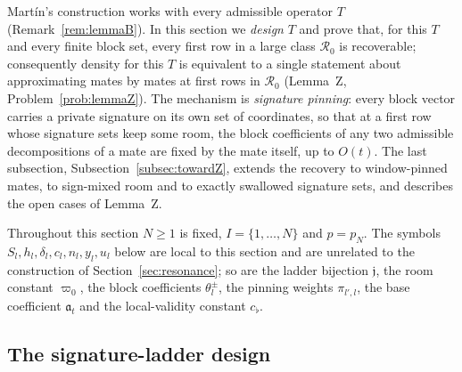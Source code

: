 \documentclass[10pt]{amsart}
\theoremstyle{definition}
\theoremstyle{remark}
\begin{document}
Mart\'in's construction works with every admissible operator $T$
(Remark~\ref{rem:lemmaB}).  In this section we \emph{design} $T$ and prove
that, for this $T$ and every finite block set, every first row in a large
class $\mathcal R_0$ is recoverable; consequently density for this $T$ is
equivalent to a single statement about approximating mates by mates at
first rows in $\mathcal R_0$ (Lemma~Z, Problem~\ref{prob:lemmaZ}).  The
mechanism is \emph{signature pinning}: every block vector carries a private
signature on its own set of coordinates, so that at a first row whose
signature sets keep some room, the block coefficients of any two admissible
decompositions of a mate are fixed by the mate itself, up to $O(t)$.  The
last subsection, Subsection~\ref{subsec:towardZ}, extends the recovery to
window-pinned mates, to sign-mixed room and to exactly swallowed signature
sets, and describes the open cases of Lemma~Z.

Throughout this section $N\ge1$ is fixed, $I=\{1,\dots,N\}$ and $p=p_N$.
The symbols $S_l,h_l,\delta_l,c_l,n_l,y_l,u_l$ below are local to this
section and are unrelated to the construction of
Section~\ref{sec:resonance}; so are the ladder bijection $\mathfrak j$, the
room constant $\varpi_0$, the block coefficients $\theta^\pm_l$, the
pinning weights $\pi_{l',l}$, the base coefficient $\mathfrak a_t$ and the
local-validity constant $c_\flat$.

\subsection{The signature-ladder design}
\end{document}
